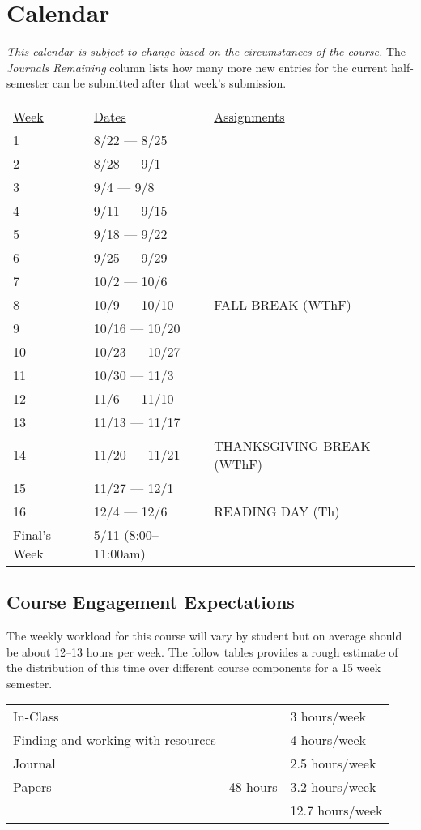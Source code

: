 \documentclass[nobib]{tufte-handout}
\begin{document}
\section{Calendar}

\textit{This calendar is subject to change based on the circumstances of the course.}  The \textit{Journals Remaining} column lists how many more new entries for the current half-semester can be submitted after that week's submission.

\begin{center}
\begin{tabular}{lll}

\underline{Week} & \underline{Dates} & \underline{Assignments} \\
1 & 8/22 --- 8/25 &  \\
2 & 8/28 --- 9/1 &  \\
3 & 9/4 --- 9/8 &  \\
4 & 9/11 --- 9/15 &  \\
5 & 9/18 --- 9/22 &  \\
6 & 9/25 --- 9/29 &  \\
7 & 10/2 --- 10/6 &    \\
8 & 10/9 --- 10/10 &  FALL BREAK (WThF)\\
9 & 10/16 --- 10/20 &  \\
10 & 10/23 --- 10/27 &  \\
11 & 10/30 --- 11/3 &  \\
12 & 11/6 --- 11/10 &  \\
13 & 11/13 --- 11/17 &  \\
14 & 11/20 --- 11/21 &  THANKSGIVING BREAK (WThF) \\
15 & 11/27 --- 12/1 &  \\
16 & 12/4 --- 12/6 &  READING DAY (Th) \\
Final's Week & 5/11 (8:00--11:00am) &  \\
\end{tabular}
\end{center}

\subsection{Course Engagement Expectations}

The weekly workload for this course will vary by student but on average should be about 12--13 hours per week.  The follow tables provides a rough estimate of the distribution of this time over different course components for a 15 week semester.
\begin{center}
\begin{tabular}{lll}
In-Class &      & 3 hours/week \\
Finding and working with resources &        & 4 hours/week \\
Journal &   & 2.5 hours/week \\
Papers & 48 hours & 3.2 hours/week \\
& & 12.7 hours/week \\
\end{tabular}
\end{center}
\end{document}
